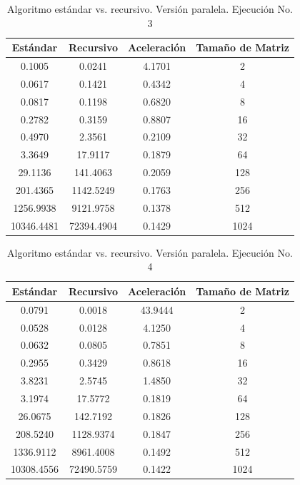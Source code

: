 \documentclass{article}
\begin{document}
\begin{table}[ht]
\centering
\begin{tabular}{|c|c|c|c|}
\hline
\textbf{Estándar} & \textbf{Recursivo} & \textbf{Aceleración} & \textbf{Tamaño de Matriz} \\
\hline
0.1005 & 0.0241 & 4.1701 & 2 \\
0.0617 & 0.1421 & 0.4342 & 4 \\
0.0817 & 0.1198 & 0.6820 & 8 \\
0.2782 & 0.3159 & 0.8807 & 16 \\
0.4970 & 2.3561 & 0.2109 & 32 \\
3.3649 & 17.9117 & 0.1879 & 64 \\
29.1136 & 141.4063 & 0.2059 & 128 \\
201.4365 & 1142.5249 & 0.1763 & 256 \\
1256.9938 & 9121.9758 & 0.1378 & 512 \\
10346.4481 & 72394.4904 & 0.1429 & 1024 \\
\hline
\end{tabular}
\caption{Algoritmo estándar vs. recursivo. Versión paralela. Ejecución No. 3}
\end{table}

\begin{table}[ht]
\centering
\begin{tabular}{|c|c|c|c|}
\hline
\textbf{Estándar} & \textbf{Recursivo} & \textbf{Aceleración} & \textbf{Tamaño de Matriz} \\
\hline
0.0791 & 0.0018 & 43.9444 & 2 \\
0.0528 & 0.0128 & 4.1250 & 4 \\
0.0632 & 0.0805 & 0.7851 & 8 \\
0.2955 & 0.3429 & 0.8618 & 16 \\
3.8231 & 2.5745 & 1.4850 & 32 \\
3.1974 & 17.5772 & 0.1819 & 64 \\
26.0675 & 142.7192 & 0.1826 & 128 \\
208.5240 & 1128.9374 & 0.1847 & 256 \\
1336.9112 & 8961.4008 & 0.1492 & 512 \\
10308.4556 & 72490.5759 & 0.1422 & 1024 \\
\hline
\end{tabular}
\caption{Algoritmo estándar vs. recursivo. Versión paralela. Ejecución No. 4}
\end{table}
\end{document}
